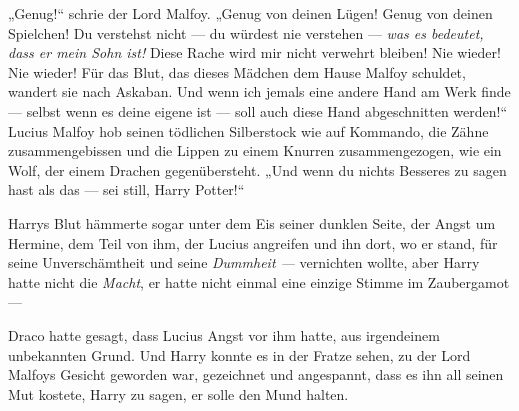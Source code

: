 „Genug!“ schrie der Lord Malfoy.
„Genug von deinen Lügen! Genug von deinen Spielchen! Du verstehst nicht — du würdest nie verstehen — \emph{was es bedeutet, dass er mein Sohn ist!} Diese Rache wird mir nicht verwehrt bleiben! Nie wieder! Nie wieder! Für das Blut, das dieses Mädchen dem Hause Malfoy schuldet, wandert sie nach Askaban. Und wenn ich jemals eine andere Hand am Werk finde — selbst wenn es deine eigene ist — soll auch diese Hand abgeschnitten werden!“
Lucius Malfoy hob seinen tödlichen Silberstock wie auf Kommando, die Zähne zusammengebissen und die Lippen zu einem Knurren zusammengezogen, wie ein Wolf, der einem Drachen gegenübersteht.
„Und wenn du nichts Besseres zu sagen hast als das — sei still, Harry Potter!“

\later

Harrys Blut hämmerte sogar unter dem Eis seiner dunklen Seite, der Angst um Hermine, dem Teil von ihm, der Lucius angreifen und ihn dort, wo er stand, für seine Unverschämtheit und seine \emph{Dummheit —} vernichten wollte, aber Harry hatte nicht die \emph{Macht}, er hatte nicht einmal eine einzige Stimme im Zaubergamot —

Draco hatte gesagt, dass Lucius Angst vor ihm hatte, aus irgendeinem unbekannten Grund. Und Harry konnte es in der Fratze sehen, zu der Lord Malfoys Gesicht geworden war, gezeichnet und angespannt, dass es ihn all seinen Mut kostete, Harry zu sagen, er solle den Mund halten.

